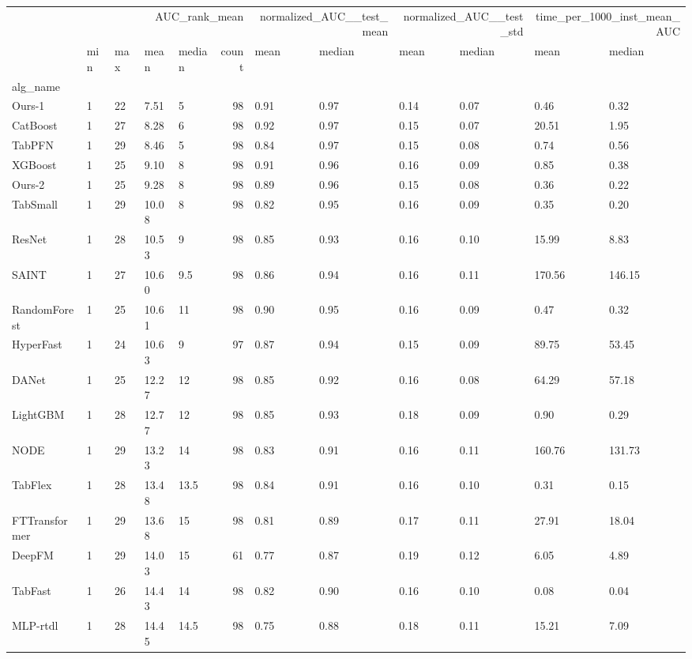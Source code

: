 \begin{tabular}{lllllrllllll}
\toprule
 & \multicolumn{5}{r}{AUC_rank_mean} & \multicolumn{2}{r}{normalized_AUC__test_mean} & \multicolumn{2}{r}{normalized_AUC__test_std} & \multicolumn{2}{r}{time_per_1000_inst_mean_AUC} \\
 & min & max & mean & median & count & mean & median & mean & median & mean & median \\
alg_name &  &  &  &  &  &  &  &  &  &  &  \\
\midrule
Ours-1 & 1 & 22 & 7.51 & 5 & 98 & 0.91 & 0.97 & 0.14 & 0.07 & 0.46 & 0.32 \\
CatBoost & 1 & 27 & 8.28 & 6 & 98 & 0.92 & 0.97 & 0.15 & 0.07 & 20.51 & 1.95 \\
TabPFN & 1 & 29 & 8.46 & 5 & 98 & 0.84 & 0.97 & 0.15 & 0.08 & 0.74 & 0.56 \\
XGBoost & 1 & 25 & 9.10 & 8 & 98 & 0.91 & 0.96 & 0.16 & 0.09 & 0.85 & 0.38 \\
Ours-2 & 1 & 25 & 9.28 & 8 & 98 & 0.89 & 0.96 & 0.15 & 0.08 & 0.36 & 0.22 \\
TabSmall & 1 & 29 & 10.08 & 8 & 98 & 0.82 & 0.95 & 0.16 & 0.09 & 0.35 & 0.20 \\
ResNet & 1 & 28 & 10.53 & 9 & 98 & 0.85 & 0.93 & 0.16 & 0.10 & 15.99 & 8.83 \\
SAINT & 1 & 27 & 10.60 & 9.5 & 98 & 0.86 & 0.94 & 0.16 & 0.11 & 170.56 & 146.15 \\
RandomForest & 1 & 25 & 10.61 & 11 & 98 & 0.90 & 0.95 & 0.16 & 0.09 & 0.47 & 0.32 \\
HyperFast & 1 & 24 & 10.63 & 9 & 97 & 0.87 & 0.94 & 0.15 & 0.09 & 89.75 & 53.45 \\
DANet & 1 & 25 & 12.27 & 12 & 98 & 0.85 & 0.92 & 0.16 & 0.08 & 64.29 & 57.18 \\
LightGBM & 1 & 28 & 12.77 & 12 & 98 & 0.85 & 0.93 & 0.18 & 0.09 & 0.90 & 0.29 \\
NODE & 1 & 29 & 13.23 & 14 & 98 & 0.83 & 0.91 & 0.16 & 0.11 & 160.76 & 131.73 \\
TabFlex & 1 & 28 & 13.48 & 13.5 & 98 & 0.84 & 0.91 & 0.16 & 0.10 & 0.31 & 0.15 \\
FTTransformer & 1 & 29 & 13.68 & 15 & 98 & 0.81 & 0.89 & 0.17 & 0.11 & 27.91 & 18.04 \\
DeepFM & 1 & 29 & 14.03 & 15 & 61 & 0.77 & 0.87 & 0.19 & 0.12 & 6.05 & 4.89 \\
TabFast & 1 & 26 & 14.43 & 14 & 98 & 0.82 & 0.90 & 0.16 & 0.10 & 0.08 & 0.04 \\
MLP-rtdl & 1 & 28 & 14.45 & 14.5 & 98 & 0.75 & 0.88 & 0.18 & 0.11 & 15.21 & 7.09 \\

\end{tabular}
